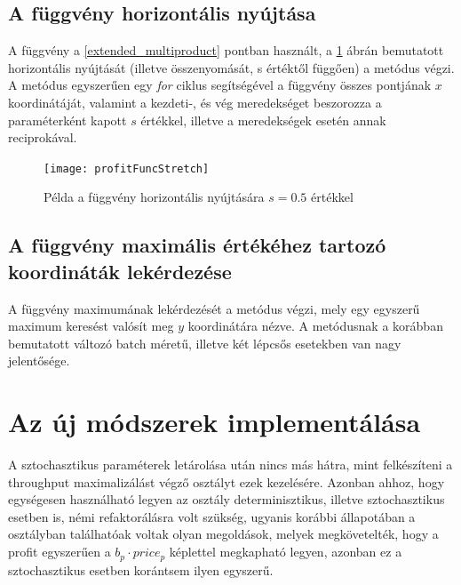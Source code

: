 \subsection{A függvény horizontális nyújtása} \label{stretch}
A függvény a \ref{extended_multiproduct} pontban használt, a \ref{profit_func_stretch} ábrán bemutatott horizontális nyújtását (illetve összenyomását, s értéktől függően) a  metódus végzi.
A metódus egyszerűen egy \textit{for} ciklus segítségével a függvény összes pontjának $x$ koordinátáját, valamint a kezdeti-, és vég meredekséget beszorozza a paraméterként kapott $s$ értékkel, illetve a meredekségek esetén annak reciprokával. 
\begin{figure}[H]
\begin{center}
\texttt{[image: profitFuncStretch]}
\caption{Példa a függvény horizontális nyújtására $s=0.5$ értékkel}
\label{profit_func_stretch}
\end{center}
\end{figure}
\subsection{A függvény maximális értékéhez tartozó koordináták lekérdezése}
A függvény maximumának lekérdezését a  metódus végzi, mely egy egyszerű maximum keresést valósít meg $y$ koordinátára nézve.
A metódusnak a korábban bemutatott változó batch méretű, illetve két lépcsős esetekben van nagy jelentősége.

\section{Az új módszerek implementálása} \label{refactor}
A sztochasztikus paraméterek letárolása után nincs más hátra, mint felkészíteni a throughput maximalizálást végző  osztályt ezek kezelésére.
Azonban ahhoz, hogy egységesen használható legyen az osztály determinisztikus, illetve sztochasztikus esetben is, némi refaktorálásra volt szükség, ugyanis korábbi állapotában a  osztályban találhatóak voltak olyan megoldások, melyek megkövetelték, hogy a profit egyszerűen a $b_p\cdot price_p$ képlettel megkapható legyen, azonban ez a sztochasztikus esetben korántsem ilyen egyszerű.
